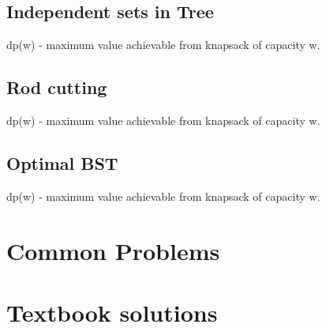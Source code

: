 \documentclass[11pt,letterpaper]{article}
\begin{document}
\subsection{Independent sets in Tree}
dp(w) - maximum value achievable from knapsack of capacity w. 

\subsection{Rod cutting}
dp(w) - maximum value achievable from knapsack of capacity w. 

\subsection{Optimal BST}
dp(w) - maximum value achievable from knapsack of capacity w. 


\section{Common Problems}
\section{Textbook solutions}
\end{document}
